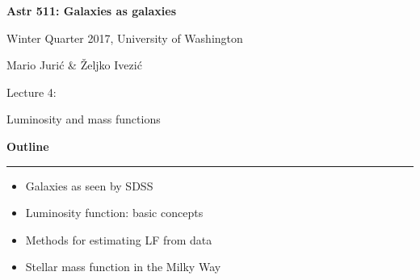 \documentclass[letterpaper,landscape]{slides}
\begin{document}

\begin{slide}

\phantom{x}
\vskip -2in
\begin{center}
\bfseries
{\large {\color{blue} Astr 511: Galaxies as galaxies}}
\end{center}

{\centerline {{\color{blue} 
Winter Quarter 2017, University of Washington}}}
{\centerline {{\color{blue} 
Mario Juri\'{c} \& \v{Z}eljko Ivezi\'{c} }}}

\vskip 1.6in

{\centerline {\huge {\color{red}      Lecture 4:             }}}
\vskip 0.2in 
{\centerline {\Large {\color{blue}  Luminosity and mass functions  }}}

\vfill
\end{slide}


\begin{slide}
\begin{center}
\bfseries
{\large {\color{red} Outline}}
\end{center}
\vskip 0.2in
\hrule

\begin{itemize}
\item Galaxies as seen by SDSS
\item Luminosity function: basic concepts
\item Methods for estimating LF from data
\item Stellar mass function in the Milky Way 
\end{itemize}


\vfill
\end{slide}








\end{document}
